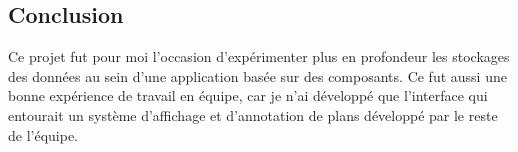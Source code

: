\subsection{Conclusion}
\label{eiffageTablePlanConclusion}

Ce projet fut pour moi l'occasion d'expérimenter plus en profondeur les stockages des données au sein d'une application basée sur des composants.
Ce fut aussi une bonne expérience de travail en équipe, car je n'ai développé que l'interface qui entourait un système d'affichage et d'annotation de plans développé par le reste de l'équipe.
